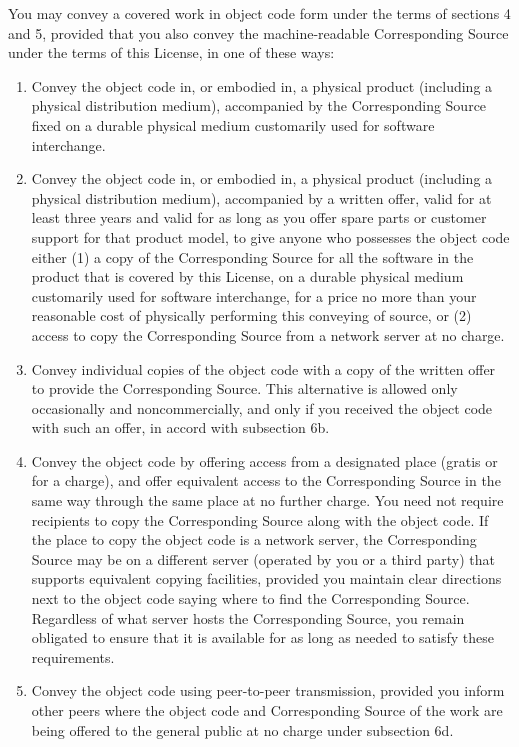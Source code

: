 \documentclass{article}
\begin{document}
\begin{enumerate}[\hspace{-18pt}1.]
You may convey a covered work in object code form under the terms of sections 4 and 5, provided that you also convey the machine-readable Corresponding Source under the terms of this License, in one of these ways:
\begin{enumerate}
  \item Convey the object code in, or embodied in, a physical product (including a physical distribution medium), accompanied by the Corresponding Source fixed on a durable physical medium customarily used for software interchange.
  \item Convey the object code in, or embodied in, a physical product (including a physical distribution medium), accompanied by a written offer, valid for at least three years and valid for as long as you offer spare parts or customer support for that product model, to give anyone who possesses the object code either (1) a copy of the Corresponding Source for all the software in the product that is covered by this License, on a durable physical medium customarily used for software interchange, for a price no more than your reasonable cost of physically performing this conveying of source, or (2) access to copy the Corresponding Source from a network server at no charge.
  \item Convey individual copies of the object code with a copy of the written offer to provide the Corresponding Source.  This alternative is allowed only occasionally and noncommercially, and only if you received the object code with such an offer, in accord with subsection 6b.
  \item Convey the object code by offering access from a designated place (gratis or for a charge), and offer equivalent access to the Corresponding Source in the same way through the same place at no further charge. You need not require recipients to copy the Corresponding Source along with the object code.  If the place to copy the object code is a network server, the Corresponding Source may be on a different server (operated by you or a third party) that supports equivalent copying facilities, provided you maintain clear directions next to the object code saying where to find the Corresponding Source.  Regardless of what server hosts the Corresponding Source, you remain obligated to ensure that it is available for as long as needed to satisfy these requirements.
  \item Convey the object code using peer-to-peer transmission, provided you inform other peers where the object code and Corresponding Source of the work are being offered to the general public at no charge under subsection 6d.
\end{enumerate}


\end{enumerate}
\end{document}
